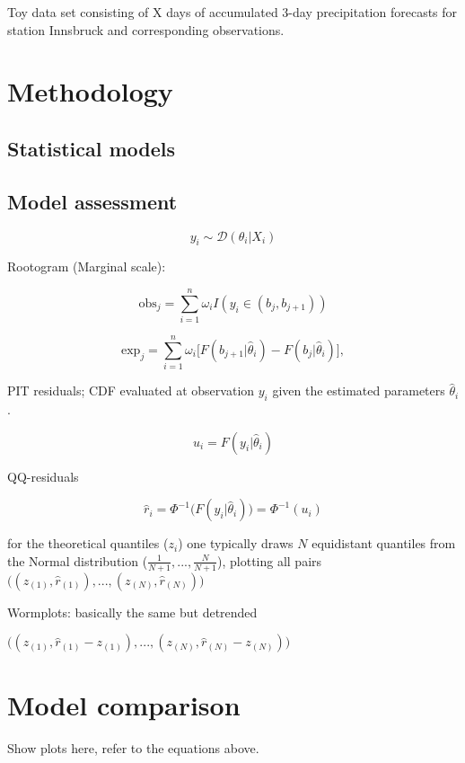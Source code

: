 \documentclass[twoside]{report}
\begin{document}
Toy data set consisting of X days of accumulated 3-day precipitation
forecasts for station Innsbruck and corresponding observations.

\section{Methodology}

\subsection{Statistical models}

\subsection{Model assessment}

$$
y_i \sim \mathcal{D}(\theta_i | X_i)
$$

Rootogram (Marginal scale):

$$
\text{obs}_j = \sum_{i=1}^n \omega_i I(y_i \in (b_j, b_{j+1}))
$$

$$
\text{exp}_j = \sum_{i=1}^n \omega_i \big[ F(b_{j+1} | \hat{\theta}_i) - F(b_{j} | \hat{\theta}_i) \big],
$$

PIT residuals; CDF evaluated at observation $y_i$ given the
estimated parameters $\hat{\theta}_i$.

$$
u_i = F(y_i | \hat{\theta}_i)
$$


QQ-residuals

$$
\hat{r}_i = \Phi^{-1}\big(F(y_i | \hat{\theta}_i)\big) = \Phi^{-1}(u_i)
$$

for the theoretical quantiles ($z_i$) one typically draws $N$ equidistant
quantiles from the Normal distribution ($\frac{1}{N+1}, ..., \frac{N}{N+1}$),
plotting all pairs $\big((z_{(1)},\hat{r}_{(1)}), ..., (z_{(N)},\hat{r}_{(N)})\big)$

Wormplots: basically the same but detrended

$\big((z_{(1)},\hat{r}_{(1)} - z_{(1)}), ..., (z_{(N)},\hat{r}_{(N)} - z_{(N)})\big)$

\section{Model comparison}

Show plots here, refer to the equations above.



\end{document}
